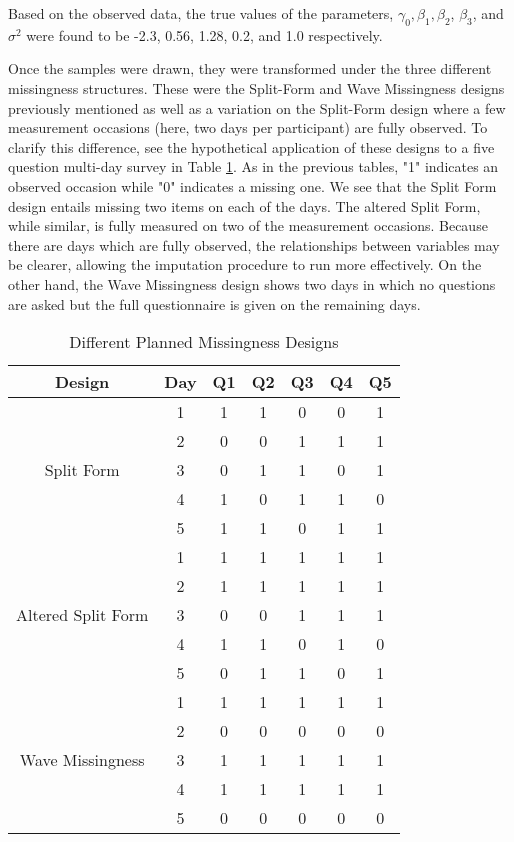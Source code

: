 \documentclass{svjour3}                     %
\begin{document}
Based on the observed data, the true values of the parameters, $\gamma_0, \beta_1, \beta_2$, $\beta_3$, and $\sigma^2$ were found to be -2.3, 0.56, 1.28, 0.2, and 1.0 respectively. \par
Once the samples were drawn, they were transformed under the three different missingness structures. These were the Split-Form and Wave Missingness designs previously mentioned as well as a variation on the Split-Form design where a few measurement occasions (here, two days per participant) are fully observed. To clarify this difference, see the hypothetical application of these designs to a five question multi-day survey in Table \ref{tab:table14}. As in the previous tables, "1" indicates an observed occasion while "0" indicates a missing one. We see that the Split Form design entails missing two items on each of the days. The altered Split Form, while similar, is fully measured on two of the measurement occasions. Because there are days which are fully observed, the relationships between variables may be clearer, allowing the imputation procedure to run more effectively. On the other hand, the Wave Missingness design shows two days in which no questions are asked but the full questionnaire is given on the remaining days. \par

\begin{table}[t!]
	\centering
	\caption{Different Planned Missingness Designs}
	\setlength{\tabcolsep}{0.45cm}
	\label{tab:table14}
	\hspace*{-1cm}
	\begin{tabular}{c|c|ccccc}
		\toprule
		Design & Day & Q1 & Q2 & Q3 & Q4 & Q5 \\
		\midrule
		\multirow{5}{*}{Split Form}
		& 1 & 1 & 1 & 0 & 0 & 1 \\
		& 2 & 0 & 0 & 1 & 1 & 1 \\
		& 3 & 0 & 1 & 1 & 0 & 1 \\
		& 4 & 1 & 0 & 1 & 1 & 0 \\
		& 5 & 1 & 1 & 0 & 1 & 1 \\
		\midrule
		\midrule
		\multirow{5}{*}{Altered Split Form}
		& 1 & 1 & 1 & 1 & 1 & 1 \\
		& 2 & 1 & 1 & 1 & 1 & 1 \\
		& 3 & 0 & 0 & 1 & 1 & 1 \\
		& 4 & 1 & 1 & 0 & 1 & 0 \\
		& 5 & 0 & 1 & 1 & 0 & 1 \\
		\midrule
		\midrule
		\multirow{5}{*}{Wave Missingness}
		& 1 & 1 & 1 & 1 & 1 & 1 \\
		& 2 & 0 & 0 & 0 & 0 & 0 \\
		& 3 & 1 & 1 & 1 & 1 & 1 \\
		& 4 & 1 & 1 & 1 & 1 & 1 \\
		& 5 & 0 & 0 & 0 & 0 & 0 \\
		\bottomrule
	\end{tabular}
	\hspace*{-1cm}	
\end{table}
\end{document}
